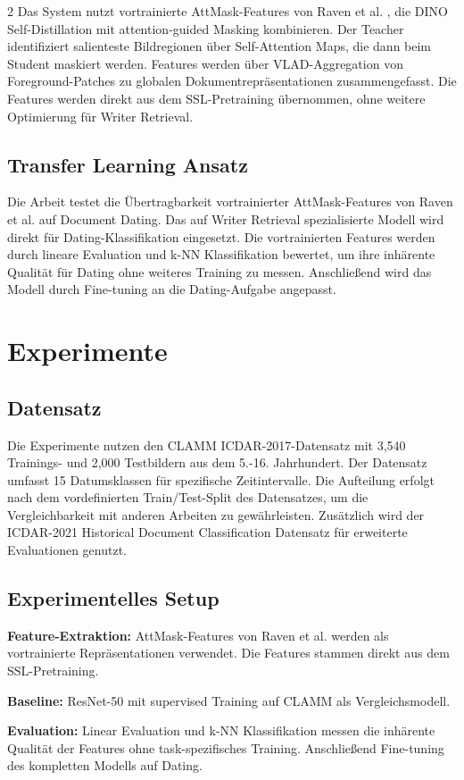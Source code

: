 \documentclass[12pt,a4paper]{article}
\begin{document}
\begin{multicols}{2}
Das System nutzt vortrainierte AttMask-Features von Raven et al. \cite{raven2024self}, die DINO Self-Distillation mit attention-guided Masking kombinieren. Der Teacher identifiziert salienteste Bildregionen über Self-Attention Maps, die dann beim Student maskiert werden. Features werden über VLAD-Aggregation von Foreground-Patches zu globalen Dokumentrepräsentationen zusammengefasst. Die Features werden direkt aus dem SSL-Pretraining übernommen, ohne weitere Optimierung für Writer Retrieval.

\subsection{Transfer Learning Ansatz}

Die Arbeit testet die Übertragbarkeit vortrainierter AttMask-Features von Raven et al. \cite{raven2024self} auf Document Dating. Das auf Writer Retrieval spezialisierte Modell wird direkt für Dating-Klassifikation eingesetzt. Die vortrainierten Features werden durch lineare Evaluation und k-NN Klassifikation bewertet, um ihre inhärente Qualität für Dating ohne weiteres Training zu messen. Anschließend wird das Modell durch Fine-tuning an die Dating-Aufgabe angepasst.

\section{Experimente}

\subsection{Datensatz}

Die Experimente nutzen den CLAMM ICDAR-2017-Datensatz mit 3,540 Trainings- und 2,000 Testbildern aus dem 5.-16. Jahrhundert. Der Datensatz umfasst 15 Datumsklassen für spezifische Zeitintervalle. Die Aufteilung erfolgt nach dem vordefinierten Train/Test-Split des Datensatzes, um die Vergleichbarkeit mit anderen Arbeiten zu gewährleisten. Zusätzlich wird der ICDAR-2021 Historical Document Classification Datensatz \cite{seuret2021icdar} für erweiterte Evaluationen genutzt.

\subsection{Experimentelles Setup}

\textbf{Feature-Extraktion:} AttMask-Features von Raven et al. werden als vortrainierte Repräsentationen verwendet. Die Features stammen direkt aus dem SSL-Pretraining.

\textbf{Baseline:} ResNet-50 mit supervised Training auf CLAMM als Vergleichsmodell.

\textbf{Evaluation:} Linear Evaluation und k-NN Klassifikation messen die inhärente Qualität der Features ohne task-spezifisches Training. Anschließend Fine-tuning des kompletten Modells auf Dating.




\end{multicols}
\end{document}

